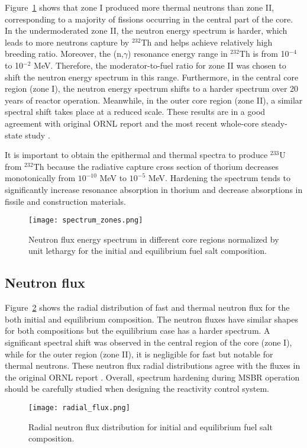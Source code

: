 Figure~\ref{fig:spectrum_zones} shows that zone I produced more thermal neutrons 
than zone II, corresponding to a majority of fissions occurring in the central part 
of the core. In the undermoderated zone II, the neutron energy spectrum is harder, 
which leads to more neutrons capture by $^{232}$Th and helps achieve relatively 
high breeding ratio. Moreover, the (n,$\gamma$) resonance energy range in $^{232}$Th 
is from 10$^{-4}$ to 10$^{-2}$ MeV. Therefore, the moderator-to-fuel ratio for zone 
II was chosen to shift the neutron energy spectrum in this range. Furthermore, in the 
central core region (zone I), the neutron energy spectrum shifts to a harder spectrum 
over 20 years of reactor operation. Meanwhile, in the outer core region (zone II), a 
similar spectral shift takes place at a reduced scale. These results are in a good 
agreement with original ORNL report \cite{robertson_conceptual_1971} and the most recent 
whole-core steady-state study \cite{park_whole_2015}.

It is important to obtain the epithermal and thermal spectra to produce $^{233}$U from 
$^{232}$Th because the radiative capture cross section of thorium decreases monotonically 
from $10^{-10}$ MeV to $10^{-5}$ MeV. Hardening the spectrum tends to significantly 
increase resonance absorption in thorium and decrease absorptions in fissile and 
construction materials. 
\begin{figure}[ht!] %
  \centering
  \texttt{[image: spectrum\_zones.png]} 
  \caption{Neutron flux energy spectrum in different core regions normalized by 
unit lethargy for the initial and equilibrium fuel salt composition.}
  \label{fig:spectrum_zones}
\end{figure}

\subsection{Neutron flux}
Figure~\ref{fig:radial_flux} shows the radial distribution of fast and thermal 
neutron flux for the both initial and equilibrium composition. The neutron fluxes
have similar shapes for both compositions but the equilibrium case has a harder 
spectrum. A significant spectral shift was observed in the central region of 
the core (zone I), while for the outer region (zone II), it is negligible for fast 
but notable for thermal neutrons. These neutron flux radial distributions 
agree with the fluxes in the original ORNL report \cite{robertson_conceptual_1971}. 
Overall, spectrum hardening during \gls{MSBR} operation should be carefully 
studied when designing the reactivity control system.
\begin{figure}[ht!] %
  \texttt{[image: radial\_flux.png]} \caption{Radial neutron 
  flux distribution for initial and equilibrium fuel salt composition.}
  \label{fig:radial_flux}
\end{figure}

